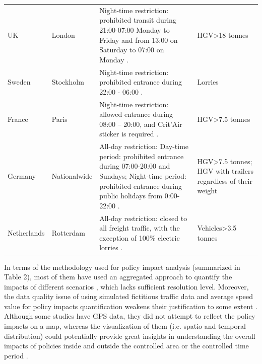 \documentclass[preprint,12pt,3p]{elsarticle}
\begin{document}
\begin{table}[H]
\begin{tabular}{m{2cm}<{\centering} m{2cm}<{\centering} m{7cm} m{3cm}<{\centering}}
    
   UK & London & Night-time restriction: prohibited transit during 21:00-07:00 Monday to Friday and from 13:00 on Saturday to 07:00 on Monday \cite{RN180}. & HGV\textgreater18 tonnes    \\
   
   Sweden & Stockholm & Night-time restriction: prohibited entrance during 22:00 - 06:00 \cite{RN175}. & Lorries \\
   
   France & Paris & Night-time restriction: allowed entrance during 08:00 – 20:00, and Crit’Air sticker is required \cite{RN175}. & HGV\textgreater7.5 tonnes \\
   
   Germany & Nationalwide & All-day restriction: 
   Day-time period: prohibited entrance during 07:00-20:00 and Sundays;
   Night-time period: prohibited entrance during public holidays from 0:00-22:00 \cite{RN176}.
   & HGV\textgreater7.5 tonnes; HGV with trailers regardless of their weight    \\
  
   Netherlands & Rotterdam & All-day restriction: closed to all freight traffic, with the exception of 100$\%$ electric lorries \cite{RN175}. & Vehicles\textgreater3.5 tonnes \\
   
   
  \bottomrule[1.2pt]
  \end{tabular}
\end{table}




In terms of the methodology used for policy impact analysis (summarized in Table 2), most of them have used an aggregated approach to quantify the impacts of different scenarios \cite{RN58,RN140,RN60}, which lacks sufficient resolution level. Moreover, the data quality issue of using simulated fictitious traffic data and average speed value for policy impacts quantification weakens their justification to some extent \cite{RN53,RN154,RN153}. Although some studies have GPS data, they did not attempt to reflect the policy impacts on a map, whereas the visualization of them (i.e. spatio and temporal distribution) could potentially provide great insights in understanding the overall impacts of policies inside and outside the controlled area or the controlled time period \cite{RN53}.
\end{document}
